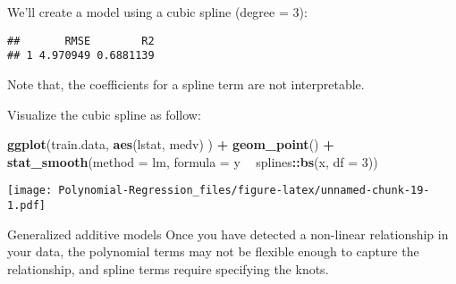 \documentclass[]{article}
\newenvironment{Shaded}{\begin{snugshade}}{\end{snugshade}}
\newcommand{\CommentTok}[1]{\textcolor[rgb]{0.56,0.35,0.01}{\textit{#1}}}
\newcommand{\DataTypeTok}[1]{\textcolor[rgb]{0.13,0.29,0.53}{#1}}
\newcommand{\DecValTok}[1]{\textcolor[rgb]{0.00,0.00,0.81}{#1}}
\newcommand{\FloatTok}[1]{\textcolor[rgb]{0.00,0.00,0.81}{#1}}
\newcommand{\KeywordTok}[1]{\textcolor[rgb]{0.13,0.29,0.53}{\textbf{#1}}}
\newcommand{\NormalTok}[1]{#1}
\newcommand{\OperatorTok}[1]{\textcolor[rgb]{0.81,0.36,0.00}{\textbf{#1}}}
\newcommand{\StringTok}[1]{\textcolor[rgb]{0.31,0.60,0.02}{#1}}
\begin{document}
We'll create a model using a cubic spline (degree = 3):

\begin{Shaded}
\end{Shaded}

\begin{verbatim}
##       RMSE        R2
## 1 4.970949 0.6881139
\end{verbatim}

Note that, the coefficients for a spline term are not interpretable.

Visualize the cubic spline as follow:

\begin{Shaded}
\begin{Highlighting}[]
\KeywordTok{ggplot}\NormalTok{(train.data, }\KeywordTok{aes}\NormalTok{(lstat, medv) ) }\OperatorTok{+}
\StringTok{  }\KeywordTok{geom_point}\NormalTok{() }\OperatorTok{+}
\StringTok{  }\KeywordTok{stat_smooth}\NormalTok{(}\DataTypeTok{method =}\NormalTok{ lm, }\DataTypeTok{formula =}\NormalTok{ y }\OperatorTok{~}\StringTok{ }\NormalTok{splines}\OperatorTok{::}\KeywordTok{bs}\NormalTok{(x, }\DataTypeTok{df =} \DecValTok{3}\NormalTok{))}
\end{Highlighting}
\end{Shaded}

\texttt{[image: Polynomial-Regression\_files/figure-latex/unnamed-chunk-19-1.pdf]}

Generalized additive models Once you have detected a non-linear
relationship in your data, the polynomial terms may not be flexible
enough to capture the relationship, and spline terms require specifying
the knots.
\end{document}

